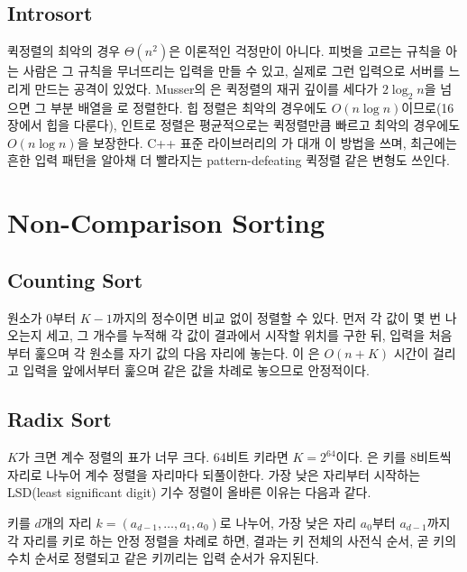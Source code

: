 \subsection{Introsort}

퀵정렬의 최악의 경우 $\Theta(n^2)$은 이론적인 걱정만이 아니다. 피벗을 고르는 규칙을 아는 사람은 그 규칙을 무너뜨리는 입력을 만들 수 있고, 실제로 그런 입력으로 서버를 느리게 만드는 공격이 있었다. Musser의 은 퀵정렬의 재귀 깊이를 세다가 $2\log_2n$을 넘으면 그 부분 배열을 로 정렬한다\cite{musser1997}. 힙 정렬은 최악의 경우에도 $O(n\log n)$이므로(16장에서 힙을 다룬다\cite{williams1964heapsort}), 인트로 정렬은 평균적으로는 퀵정렬만큼 빠르고 최악의 경우에도 $O(n\log n)$을 보장한다. C++ 표준 라이브러리의 가 대개 이 방법을 쓰며, 최근에는 흔한 입력 패턴을 알아채 더 빨라지는 pattern-defeating 퀵정렬 같은 변형도 쓰인다\cite{peters2021pdq}.

\section{Non-Comparison Sorting}
\label{sec:radix}

\subsection{Counting Sort}

원소가 $0$부터 $K-1$까지의 정수이면 비교 없이 정렬할 수 있다. 먼저 각 값이 몇 번 나오는지 세고, 그 개수를 누적해 각 값이 결과에서 시작할 위치를 구한 뒤, 입력을 처음부터 훑으며 각 원소를 자기 값의 다음 자리에 놓는다. 이 은 $O(n+K)$ 시간이 걸리고 입력을 앞에서부터 훑으며 같은 값을 차례로 놓으므로 안정적이다.

\subsection{Radix Sort}

$K$가 크면 계수 정렬의 표가 너무 크다. 64비트 키라면 $K=2^{64}$이다. 은 키를 $8$비트씩 자리로 나누어 계수 정렬을 자리마다 되풀이한다. 가장 낮은 자리부터 시작하는 LSD(least significant digit) 기수 정렬이 올바른 이유는 다음과 같다.

\begin{theorem}
\label{thm:lsd-radix}
키를 $d$개의 자리 $k=(a_{d-1},\dots,a_1,a_0)$로 나누어, 가장 낮은 자리 $a_0$부터 $a_{d-1}$까지 각 자리를 키로 하는 안정 정렬을 차례로 하면, 결과는 키 전체의 사전식 순서, 곧 키의 수치 순서로 정렬되고 같은 키끼리는 입력 순서가 유지된다.
\end{theorem}

